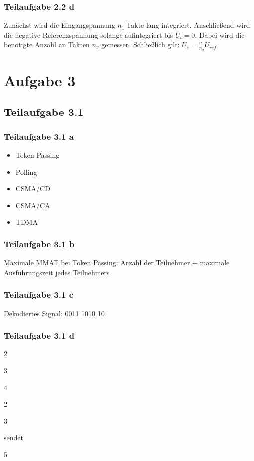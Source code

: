 \documentclass[a4paper]{scrartcl}
\begin{document}
  \subsubsection*{Teilaufgabe 2.2 d}
  Zunächst wird die Eingangspannung $n_1$ Takte lang integriert.
  Anschließend wird die negative Referenzspannung solange aufintegriert bis $U_i = 0$.
  Dabei wird die benötigte Anzahl an Takten $n_2$ gemessen.
  Schließlich gilt: $U_e = \frac{n_1}{n_2} U_{ref}$

  \section*{Aufgabe 3}
  \subsection*{Teilaufgabe 3.1}
  \subsubsection*{Teilaufgabe 3.1 a}
  \begin{itemize}
      \item Token-Passing
	  \item Polling
	  \item CSMA/CD
	  \item CSMA/CA
	  \item TDMA
  \end{itemize}

  \subsubsection*{Teilaufgabe 3.1 b}
  Maximale MMAT bei Token Passing: Anzahl der Teilnehmer + maximale Ausführungszeit jedes Teilnehmers

  \subsubsection*{Teilaufgabe 3.1 c}
  Dekodiertes Signal: 0011 1010 10

  \subsubsection*{Teilaufgabe 3.1 d}
  \begin{enumerate*}[label=(l\arabic*)]
      \item 2
      \item 3
      \item 4
      \item 2
      \item 3
      \item sendet
      \item 5
  \end{enumerate*}
\end{document}
